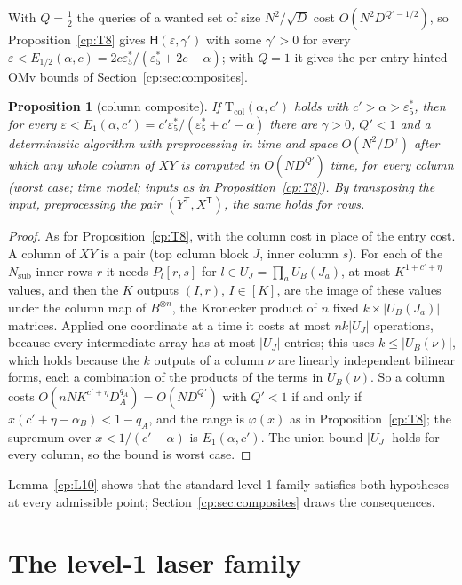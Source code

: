\documentclass[11pt]{article}
\newtheorem{proposition}[theorem]{Proposition}
\theoremstyle{definition}
\theoremstyle{remark}
\providecommand{\eps}{\varepsilon}
\newcommand{\abs}[1]{\lvert #1\rvert}
\newcommand{\Hyp}{\mathsf{H}}                 %
\newcommand{\es}{\varepsilon^*_5}             %
\newcommand{\alB}{\alpha_B}                   %
\newcommand{\Tcol}{\mathrm{T}_{\mathrm{col}}} %
\begin{document}
With $Q=\frac12$ the queries of a wanted set of size $N^2/\sqrt D$ cost $O(N^2D^{Q'-1/2})$, so Proposition~\ref{cp:T8} gives $\Hyp(\eps,\gamma')$ with some $\gamma'>0$ for every $\eps<E_{1/2}(\alpha,c)=2c\es/(\es+2c-\alpha)$; with $Q=1$ it gives the per-entry hinted-OMv bounds of Section~\ref{cp:sec:composites}.

\begin{proposition}[column composite]\label{cp:T9}
If $\Tcol(\alpha,c')$ holds with $c'>\alpha>\es$, then for every $\eps<E_1(\alpha,c')=c'\es/(\es+c'-\alpha)$ there are $\gamma>0$, $Q'<1$ and a deterministic algorithm with preprocessing in time and space $O(N^2/D^\gamma)$ after which any whole column of $XY$ is computed in $O(ND^{Q'})$ time, for every column (worst case; time model; inputs as in Proposition~\ref{cp:T8}). By transposing the input, preprocessing the pair $(Y^{\mathsf T},X^{\mathsf T})$, the same holds for rows.
\end{proposition}

\begin{proof}
As for Proposition~\ref{cp:T8}, with the column cost in place of the entry cost. A column of $XY$ is a pair (top column block $J$, inner column $s$). For each of the $N_{\mathrm{sub}}$ inner rows $r$ it needs $P_l[r,s]$ for $l\in U_J=\prod_aU_B(J_a)$, at most $K^{1+c'+\eta}$ values, and then the $K$ outputs $(I,r)$, $I\in[K]$, are the image of these values under the column map of $B^{\otimes n}$, the Kronecker product of $n$ fixed $k\times\abs{U_B(J_a)}$ matrices. Applied one coordinate at a time it costs at most $nk\abs{U_J}$ operations, because every intermediate array has at most $\abs{U_J}$ entries; this uses $k\le\abs{U_B(\nu)}$, which holds because the $k$ outputs of a column $\nu$ are linearly independent bilinear forms, each a combination of the products of the terms in $U_B(\nu)$. So a column costs $O(nNK^{c'+\eta}D_A^{q_A})=O(ND^{Q'})$ with $Q'<1$ if and only if $x(c'+\eta-\alB)<1-q_A$, and the range is $\varphi(x)$ as in Proposition~\ref{cp:T8}; the supremum over $x<1/(c'-\alpha)$ is $E_1(\alpha,c')$. The union bound $\abs{U_J}$ holds for every column, so the bound is worst case.
\end{proof}

Lemma~\ref{cp:L10} shows that the standard level-1 family satisfies both hypotheses at every admissible point; Section~\ref{cp:sec:composites} draws the consequences.

\section{The level-1 laser family}\label{cp:sec:level1}
\end{document}
